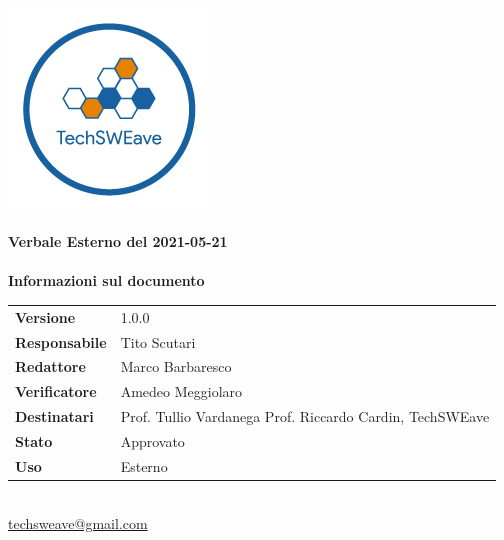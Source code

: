 \documentclass[a4paper]{article}
\begin{document}
\begin{titlepage}
    \begin{center}
        \includegraphics{../../../../Images/logo.png}\\
        \vspace{20px}
        \textcolor{logo}{\hrulefill}\\
        \vspace{20px}
        \textbf{\huge\textcolor{logo}{Verbale Esterno del 2021-05-21}}\\
        \vspace{10px}
        \textcolor{logo}{\hrulefill}\\
        \vspace{40px}
        \textbf{\Large Informazioni sul documento}\\
        \vspace{20px}
        \begin{tabular}{p{100px} | p{100px}}
            \textbf{Versione}     & 1.0.0                                                                      \\
            \textbf{Responsabile} & Tito Scutari                                                               \\
            \textbf{Redattore}    & Marco Barbaresco                                                           \\
            \textbf{Verificatore} & Amedeo Meggiolaro                                                          \\
            \textbf{Destinatari}  & Prof. Tullio Vardanega \newline Prof. Riccardo Cardin, \newline TechSWEave \\
            \textbf{Stato}        & Approvato                                                                  \\
            \textbf{Uso}          & Esterno                                                                    \\
        \end{tabular}\\
        \vspace{60px}
        \href{mailto:techsweave@gmail.com}{techsweave@gmail.com}\\

    \end{center}
\end{titlepage}
\end{document}
